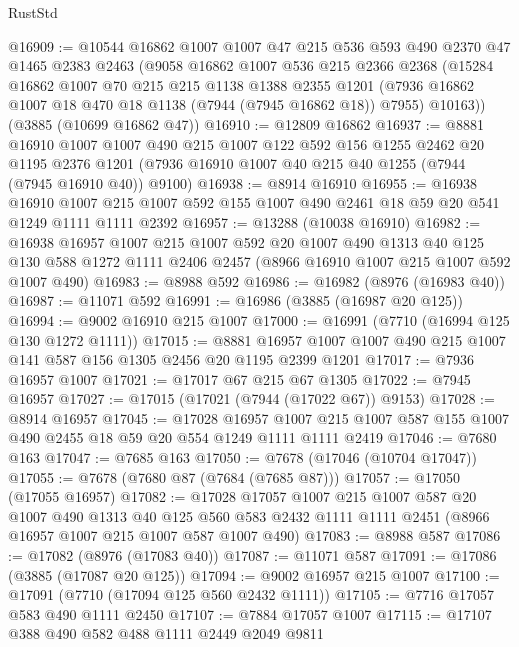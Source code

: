 \begin{lexlean}{RustStd}
\begin{coremodule}
@16909 := @10544
    @16862
    @1007
    @1007
    @47
    @215
    @536
    @593
    @490
    @2370
    @47
    @1465
    @2383
    @2463
    (@9058
      @16862
      @1007
      @536
      @215
      @2366
      @2368
      (@15284
        @16862
        @1007
        @70
        @215
        @215
        @1138
        @1388
        @2355
        @1201
        (@7936 @16862 @1007 @18 @470 @18 @1138 (@7944 (@7945 @16862 @18)) @7955)
        @10163))
    (@3885 (@10699 @16862 @47))
@16910 := @12809 @16862
@16937 := @8881
    @16910
    @1007
    @1007
    @490
    @215
    @1007
    @122
    @592
    @156
    @1255
    @2462
    @20
    @1195
    @2376
    @1201
    (@7936 @16910 @1007 @40 @215 @40 @1255 (@7944 (@7945 @16910 @40)) @9100)
@16938 := @8914 @16910
@16955 := @16938
    @16910
    @1007
    @215
    @1007
    @592
    @155
    @1007
    @490
    @2461
    @18
    @59
    @20
    @541
    @1249
    @1111
    @1111
    @2392
@16957 := @13288 (@10038 @16910)
@16982 := @16938
    @16957
    @1007
    @215
    @1007
    @592
    @20
    @1007
    @490
    @1313
    @40
    @125
    @130
    @588
    @1272
    @1111
    @2406
    @2457
    (@8966 @16910 @1007 @215 @1007 @592 @1007 @490)
@16983 := @8988 @592
@16986 := @16982 (@8976 (@16983 @40))
@16987 := @11071 @592
@16991 := @16986 (@3885 (@16987 @20 @125))
@16994 := @9002 @16910 @215 @1007
@17000 := @16991 (@7710 (@16994 @125 @130 @1272 @1111))
@17015 := @8881 @16957 @1007 @1007 @490 @215 @1007 @141 @587 @156 @1305 @2456 @20 @1195 @2399 @1201
@17017 := @7936 @16957 @1007
@17021 := @17017 @67 @215 @67 @1305
@17022 := @7945 @16957
@17027 := @17015 (@17021 (@7944 (@17022 @67)) @9153)
@17028 := @8914 @16957
@17045 := @17028
    @16957
    @1007
    @215
    @1007
    @587
    @155
    @1007
    @490
    @2455
    @18
    @59
    @20
    @554
    @1249
    @1111
    @1111
    @2419
@17046 := @7680 @163
@17047 := @7685 @163
@17050 := @7678 (@17046 (@10704 @17047))
@17055 := @7678 (@7680 @87 (@7684 (@7685 @87)))
@17057 := @17050 (@17055 @16957)
@17082 := @17028
    @17057
    @1007
    @215
    @1007
    @587
    @20
    @1007
    @490
    @1313
    @40
    @125
    @560
    @583
    @2432
    @1111
    @1111
    @2451
    (@8966 @16957 @1007 @215 @1007 @587 @1007 @490)
@17083 := @8988 @587
@17086 := @17082 (@8976 (@17083 @40))
@17087 := @11071 @587
@17091 := @17086 (@3885 (@17087 @20 @125))
@17094 := @9002 @16957 @215 @1007
@17100 := @17091 (@7710 (@17094 @125 @560 @2432 @1111))
@17105 := @7716 @17057 @583 @490 @1111 @2450
@17107 := @7884 @17057 @1007
@17115 := @17107 @388 @490 @582 @488 @1111 @2449 @2049 @9811

\end{coremodule}
\end{lexlean}
